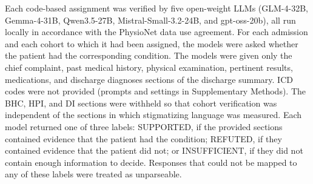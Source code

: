 \documentclass[unnumsec,webpdf,contemporary,large]{oup-authoring-template}
\newcommand{\td}[1]{\sethlcolor{pink}\hl{[Ting: #1]}}
\begin{document}
Each code-based assignment was verified by five open-weight LLMs (GLM-4-32B, Gemma-4-31B, Qwen3.5-27B, Mistral-Small-3.2-24B, and gpt-oss-20b),\cite{glm2024chatglm,gemma2026gemma4,qwen2025qwen3,mistral2025small,openai2025gptoss} all run locally in accordance with the PhysioNet data use agreement. For each admission and each cohort to which it had been assigned, the models were asked whether the patient had the corresponding condition. The models were given only the chief complaint, past medical history, physical examination, pertinent results, medications, and discharge diagnoses sections of the discharge summary. ICD codes were not provided (prompts and settings in Supplementary Methods). The BHC, HPI, and DI sections were withheld so that cohort verification was independent of the sections in which stigmatizing language was measured. Each model returned one of three labels: SUPPORTED, if the provided sections contained evidence that the patient had the condition; REFUTED, if they contained evidence that the patient did not; or INSUFFICIENT, if they did not contain enough information to decide. Responses that could not be mapped to any of these labels were treated as unparseable.


\end{document}
